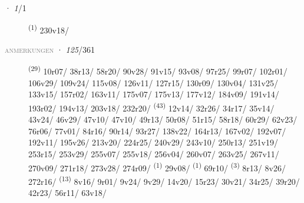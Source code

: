 \noindent{} · \textit{1}/1 \LEMMALINE
\begin{description}
    \item[]  \textsuperscript{(1)} \mbox{230v18/}
\end{description}
\textsc{\textcolor{gray}{anmerkungen}}
\ENTRYEND
\noindent{} · \textit{125}/361 \LEMMALINE
\begin{description}
    \item[]  \textsuperscript{(29)} \mbox{10r07/} \mbox{38r13/} \mbox{58r20/} \mbox{90v28/} \mbox{91v15/} \mbox{93v08/} \mbox{97r25/} \mbox{99r07/} \mbox{102r01/} \mbox{106v29/} \mbox{109v24/} \mbox{115v08/} \mbox{126v11/} \mbox{127r15/} \mbox{130r09/} \mbox{130v04/} \mbox{131v25/} \mbox{133v15/} \mbox{157r02/} \mbox{163v11/} \mbox{175v07/} \mbox{175v13/} \mbox{177v12/} \mbox{184v09/} \mbox{191v14/} \mbox{193r02/} \mbox{194v13/} \mbox{203v18/} \mbox{232r20/} \textsuperscript{(43)} \mbox{12v14/} \mbox{32r26/} \mbox{34r17/} \mbox{35v14/} \mbox{43v24/} \mbox{46v29/} \mbox{47v10/} \mbox{47v10/} \mbox{49r13/} \mbox{50r08/} \mbox{51r15/} \mbox{58r18/} \mbox{60r29/} \mbox{62v23/} \mbox{76r06/} \mbox{77v01/} \mbox{84r16/} \mbox{90r14/} \mbox{93r27/} \mbox{138v22/} \mbox{164r13/} \mbox{167v02/} \mbox{192v07/} \mbox{192v11/} \mbox{195v26/} \mbox{213v20/} \mbox{224r25/} \mbox{240v29/} \mbox{243v10/} \mbox{250r13/} \mbox{251v19/} \mbox{253r15/} \mbox{253v29/} \mbox{255v07/} \mbox{255v18/} \mbox{256v04/} \mbox{260v07/} \mbox{263v25/} \mbox{267v11/} \mbox{270v09/} \mbox{271r18/} \mbox{273v28/} \mbox{274r09/} \textsuperscript{(1)} \mbox{29v08/} \textsuperscript{(1)} \mbox{69r10/} \CASEBREAK {} \textsuperscript{(3)} \mbox{8r13/} \mbox{8v26/} \mbox{272r16/} \textsuperscript{(13)} \mbox{8v16/} \mbox{9r01/} \mbox{9v24/} \mbox{9v29/} \mbox{14v20/} \mbox{15r23/} \mbox{30v21/} \mbox{34r25/} \mbox{39r20/} \mbox{42r23/} \mbox{56r11/} \mbox{63v18/} 
\end{description}
